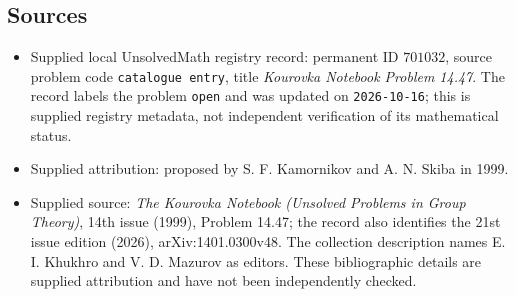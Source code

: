 \documentclass[11pt]{article}
\begin{document}
\subsection{Sources}
\begin{itemize}
\item Supplied local UnsolvedMath registry record: permanent ID \(701032\), source problem code \texttt{catalogue entry}, title \emph{Kourovka Notebook Problem 14.47}. The record labels the problem \texttt{open} and was updated on \texttt{2026-10-16}; this is supplied registry metadata, not independent verification of its mathematical status.
\item Supplied attribution: proposed by S. F. Kamornikov and A. N. Skiba in 1999.
\item Supplied source: \emph{The Kourovka Notebook (Unsolved Problems in Group Theory)}, 14th issue (1999), Problem 14.47; the record also identifies the 21st issue edition (2026), arXiv:1401.0300v48. The collection description names E. I. Khukhro and V. D. Mazurov as editors. These bibliographic details are supplied attribution and have not been independently checked.
\end{itemize}
\end{document}
